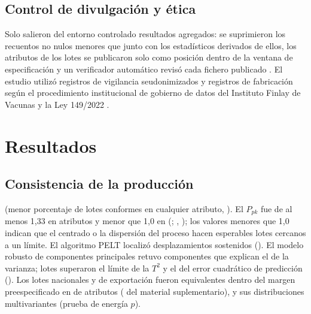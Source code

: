 \documentclass[11pt]{article}
\begin{document}
\subsection{Control de divulgación y ética}\label{sec:m-sdc}
Solo salieron del entorno controlado resultados agregados: se suprimieron los recuentos no nulos
menores que \VMinCell{} junto con los estadísticos derivados de ellos, los atributos de los lotes se
publicaron solo como posición dentro de la ventana de especificación y un verificador automático
revisó cada fichero publicado \cite{Hundepool2012}. El estudio utilizó registros de vigilancia
seudonimizados y registros de fabricación según el procedimiento institucional de gobierno de datos
del Instituto Finlay de Vacunas y la Ley 149/2022 \cite{Ley149}.

\section{Resultados}\label{sec:results}

\subsection{Consistencia de la producción}\label{sec:r-spc}
\PTConformitySentence{} (menor porcentaje de lotes conformes en cualquier atributo,
\PTPctConforming). El $P_{pk}$ fue de al menos 1,33 en \PTNAttrPpkAbove{} atributos y menor que 1,0
en \PTNAttrPpkBelowOne{} (\PTPpkBelowOneList; , );
los valores menores que 1,0 indican que el centrado o la dispersión del proceso hacen esperables
lotes cercanos a un límite. El algoritmo PELT localizó \PTNChangepoints{} desplazamientos sostenidos
(\PTChangepointList). El modelo robusto de componentes principales retuvo \PTNComponents{}
componentes que explican el \PTExplainedVar{} de la varianza; \PTTTwoFlagged{} lotes superaron el
límite de la $T^2$ y \PTSPEFlagged{} el del error cuadrático de predicción (). Los
lotes nacionales y de exportación fueron equivalentes dentro del margen preespecificado en
\PTNEquivalent{} de \PTNAttributes{} atributos ( del material
suplementario), y sus distribuciones multivariantes \PTEnergyWord{} (prueba de energía
$p$\PTEnergyP).

\begin{table}[tbp]
\centering\small
\caption{Desempeño del proceso de los lotes de VA-MENGOC-BC: $P_{pk}$ con intervalo bootstrap del
95\,\% para todos los lotes y por período de producción, y año de producción de los puntos de cambio
localizados por PELT.}
\label{tab:capability}
\PTTableCapability
\end{table}
\end{document}
